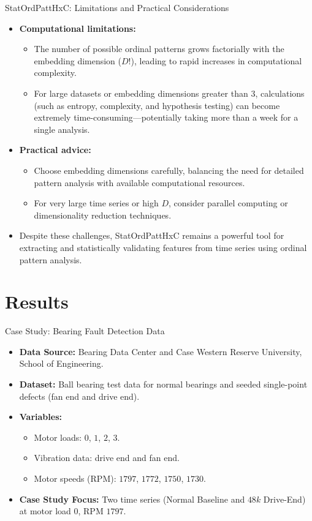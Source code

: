 \documentclass{beamer}
\begin{document}
\begin{frame}{StatOrdPattHxC: Limitations and Practical Considerations}
	\begin{itemize}
		\item \textbf{Computational limitations:}
		\begin{itemize}
			\item The number of possible ordinal patterns grows factorially with the embedding dimension ($D!$), leading to rapid increases in computational complexity.
			\item For large datasets or embedding dimensions greater than 3, calculations (such as entropy, complexity, and hypothesis testing) can become extremely time-consuming—potentially taking more than a week for a single analysis.
		\end{itemize}
		\item \textbf{Practical advice:}
		\begin{itemize}
			\item Choose embedding dimensions carefully, balancing the need for detailed pattern analysis with available computational resources.
			\item For very large time series or high $D$, consider parallel computing or dimensionality reduction techniques.
		\end{itemize}
		\item Despite these challenges, StatOrdPattHxC remains a powerful tool for extracting and statistically validating features from time series using ordinal pattern analysis.
	\end{itemize}
\end{frame}


\section{Results}
\begin{frame}{Case Study: Bearing Fault Detection Data}
	\begin{itemize}
		\item \textbf{Data Source:} Bearing Data Center and Case Western Reserve University, School of Engineering.
		\item \textbf{Dataset:} Ball bearing test data for normal bearings and seeded single-point defects (fan end and drive end).
		\item \textbf{Variables:}
		\begin{itemize}
			\item Motor loads: $0$, $1$, $2$, $3$.
			\item Vibration data: drive end and fan end.
			\item Motor speeds (RPM): $1797$, $1772$, $1750$, $1730$.
		\end{itemize}
		\item \textbf{Case Study Focus:} Two time series (Normal Baseline and $48k$ Drive-End) at motor load $0$, RPM $1797$.
	\end{itemize}
\end{frame}
\end{document}
